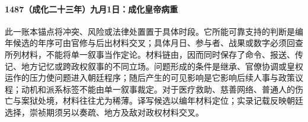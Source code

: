 \paragraph{1487（成化二十三年）九月1日：成化皇帝病重} 此一账本锚点将冲突、风险或法律处置置于具体时段。它所能可靠支持的判断是编年候选的年序可由官修与后出材料交叉；具体月日、参与者、战果或数字必须回查所列材料，不能将单一叙事当作定论。材料链由，因而同时保存了命令、报送、传记、地方记忆或跨政权叙事的不同立场。问题形成的条件是继承、官僚协调或皇权运作的压力使问题进入朝廷程序；随后产生的可见影响是它影响后续人事与政策议程；动机和派系标签不能由单一叙事裁定。对于医疗救助、慈善网络、普通人的伤亡与案狱处境，材料往往尤为稀薄。译写候选以编年材料定位；实录记载反映朝廷选择，崇祯期须另以奏疏、地方及敌对政权材料交叉。
